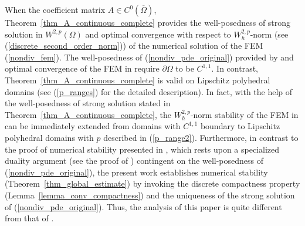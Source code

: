 \documentclass[12pt]{amsart}
\theoremstyle{definition}
\theoremstyle{remark}
\begin{document}
When the coefficient matrix $A \in C^{0}(\overline{\Omega})$, Theorem~\ref{thm_A_continuous_complete} 
provides the well-posedness of strong solution in $W^{2,p}(\Omega)$ and optimal convergence 
with respect to $W_{h}^{2,p}$-norm (see (\ref{discrete_second_order_norm})) of the numerical 
solution of the FEM (\ref{nondiv_fem}). The well-posedness of (\ref{nondiv_pde_original}) 
provided by \cite[Theorem~$9.15$]{GT01} and optimal convergence of the FEM in \cite{FHM2017}
require $\partial\Omega$ to be $C^{1,1}$. 
In contrast, Theorem~\ref{thm_A_continuous_complete} 
is valid on Lipschitz polyhedral domains (see (\ref{p_ranges}) for the detailed description). 
In fact, with the help of the well-posedness of strong solution stated in 
Theorem~\ref{thm_A_continuous_complete},  the $W_{h}^{2,p}$-norm stability of the FEM in \cite{FHM2017} 
can be immediately extended from domains with $C^{1,1}$ 
boundary to Lipschitz polyhedral domains with $p$ described in (\ref{p_range2}). 
Furthermore, in contrast to the proof of numerical stability presented in \cite{FHM2017}, which rests upon 
a specialized duality argument (see the proof of \cite[Lemma~$3.5$]{FHM2017}) contingent on 
the well-posedness of (\ref{nondiv_pde_original}),  the present work establishes numerical stability 
(Theorem~\ref{thm_global_estimate}) by invoking the discrete compactness property  (Lemma~\ref{lemma_conv_compactness}) 
and the uniqueness of the strong solution of (\ref{nondiv_pde_original}). Thus, the analysis of this paper is 
quite different from that of \cite{FHM2017,FNS1,Neilan2}.  
\end{document}
